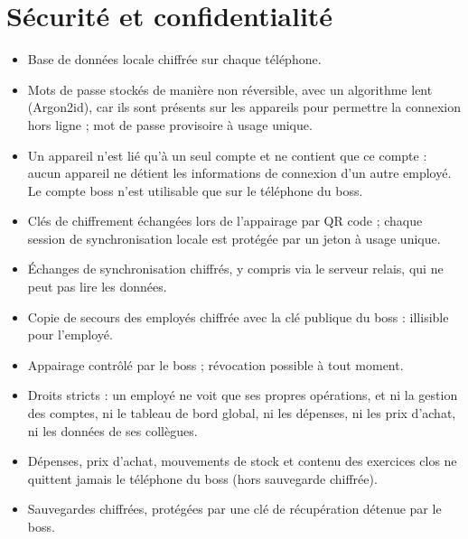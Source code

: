 \documentclass[11pt,a4paper]{article}
\begin{document}
	\section{Sécurité et confidentialité}
	\begin{itemize}[leftmargin=*]
		\item Base de données locale chiffrée sur chaque téléphone.
		\item Mots de passe stockés de manière non réversible, avec un algorithme lent (Argon2id), car ils sont présents sur les appareils pour permettre la connexion hors ligne ; mot de passe provisoire à usage unique.
		\item Un appareil n'est lié qu'à un seul compte et ne contient que ce compte : aucun appareil ne détient les informations de connexion d'un autre employé. Le compte boss n'est utilisable que sur le téléphone du boss.
		\item Clés de chiffrement échangées lors de l'appairage par QR code ; chaque session de synchronisation locale est protégée par un jeton à usage unique.
		\item Échanges de synchronisation chiffrés, y compris via le serveur relais, qui ne peut pas lire les données.
		\item Copie de secours des employés chiffrée avec la clé publique du boss : illisible pour l'employé.
		\item Appairage contrôlé par le boss ; révocation possible à tout moment.
		\item Droits stricts : un employé ne voit que ses propres opérations, et ni la gestion des comptes, ni le tableau de bord global, ni les dépenses, ni les prix d'achat, ni les données de ses collègues.
		\item Dépenses, prix d'achat, mouvements de stock et contenu des exercices clos ne quittent jamais le téléphone du boss (hors sauvegarde chiffrée).
		\item Sauvegardes chiffrées, protégées par une clé de récupération détenue par le boss.
	\end{itemize}

\end{document}
